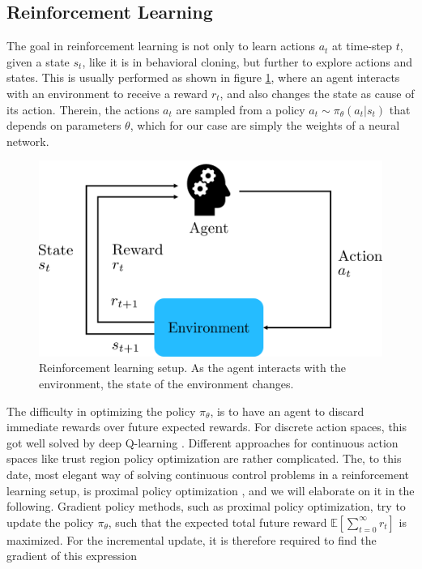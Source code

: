 \FloatBarrier
\subsection{Reinforcement Learning}
\label{sec::223_rl}
The goal in reinforcement learning is not only to learn actions $a_t$ at time-step $t$, given a state $s_t$, like it is in behavioral cloning, but further to explore actions and states. This is usually performed as shown in figure \ref{fig::223_rl}, where an agent interacts with an environment to receive a reward $r_t$, and also changes the state as cause of its action. Therein, the actions $a_t$ are sampled from a policy $a_t\sim\pi_\theta(a_t|s_t)$ that depends on parameters $\theta$, which for our case are simply the weights of a neural network. 
\begin{figure}[h!]
	\centering
	\includegraphics[scale=.5]{chapters/02_background/img/reinforcement_learning.png}
	\caption{Reinforcement learning setup. As the agent interacts with the environment, the state of the environment changes.}
	\label{fig::223_rl}
\end{figure}
The difficulty in optimizing the policy $\pi_\theta$, is to have an agent to discard immediate rewards over future expected rewards. For discrete action spaces, this got well solved by deep Q-learning \cite{mnih2015human}. Different approaches for continuous action spaces like trust region policy optimization \cite{schulman2015trust} are rather complicated. The, to this date, most elegant way of solving continuous control problems in a reinforcement learning setup, is proximal policy optimization \cite{schulman2017proximal}, and we will elaborate on it in the following. Gradient policy methods, such as proximal policy optimization, try to update the policy $\pi_\theta$, such that the expected total future reward $\mathbb{E}\left[\sum_{t=0}^\infty r_t\right]$ is maximized. For the incremental update, it is therefore required to find the gradient of this expression
